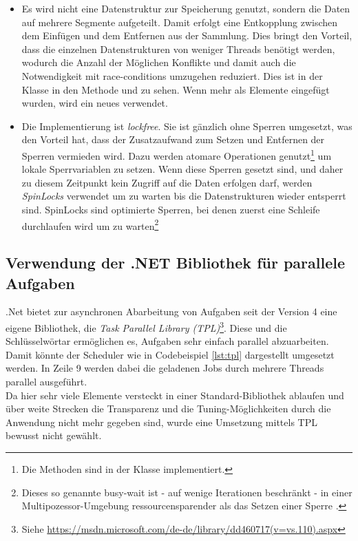 \begin{itemize}
	\item Es wird nicht eine Datenstruktur zur Speicherung genutzt, sondern die Daten auf mehrere Segmente aufgeteilt. Damit erfolgt eine Entkopplung zwischen dem Einfügen und dem Entfernen aus der Sammlung. Dies bringt den Vorteil, dass die einzelnen Datenstrukturen von weniger Threads benötigt werden, wodurch die Anzahl der Möglichen Konflikte und damit auch die Notwendigkeit mit race-conditions umzugehen reduziert. Dies ist in der Klasse  in den Methode  und  zu sehen. Wenn mehr als  Elemente eingefügt wurden, wird ein neues  verwendet.
	\item Die Implementierung ist \emph{lock\-free}. Sie ist gänzlich ohne Sperren umgesetzt, was den Vorteil hat, dass der Zusatzaufwand zum Setzen und Entfernen der Sperren vermieden wird. Dazu werden atomare Operationen genutzt\footnote{Die Methoden sind in der Klasse  implementiert.} um lokale Sperrvariablen zu setzen. Wenn diese Sperren gesetzt sind, und daher zu diesem Zeitpunkt kein Zugriff auf die Daten erfolgen darf, werden \emph{SpinLocks} verwendet um zu warten bis die Datenstrukturen wieder entsperrt sind. SpinLocks sind optimierte Sperren, bei denen zuerst eine Schleife durchlaufen wird um zu warten\footnote{Dieses so genannte busy-wait ist - auf wenige Iterationen beschränkt - in einer Multipozessor-Umgebung ressourcensparender als das Setzen einer Sperre \parencite[S. 70]{masterk}.} 
\end{itemize}


\subsection{Verwendung der .NET Bibliothek für parallele Aufgaben}
.Net bietet zur asynchronen Abarbeitung von Aufgaben seit der Version 4 eine eigene Bibliothek, die \emph{Task Parallel Library (TPL)}\footnote{Siehe \url{https://msdn.microsoft.com/de-de/library/dd460717(v=vs.110).aspx}}. Diese und die Schlüsselwörtar  ermöglichen es, Aufgaben sehr einfach parallel abzuarbeiten. Damit könnte der Scheduler wie in Codebeispiel \ref{lst:tpl} dargestellt umgesetzt werden. In Zeile 9 werden dabei die geladenen Jobs durch mehrere Threads parallel  ausgeführt.
\\Da hier sehr viele Elemente versteckt in einer Standard-Bibliothek ablaufen und über weite Strecken die Transparenz und die Tuning-Möglichkeiten durch die Anwendung nicht mehr gegeben sind, wurde eine Umsetzung mittels TPL bewusst nicht gewählt.

